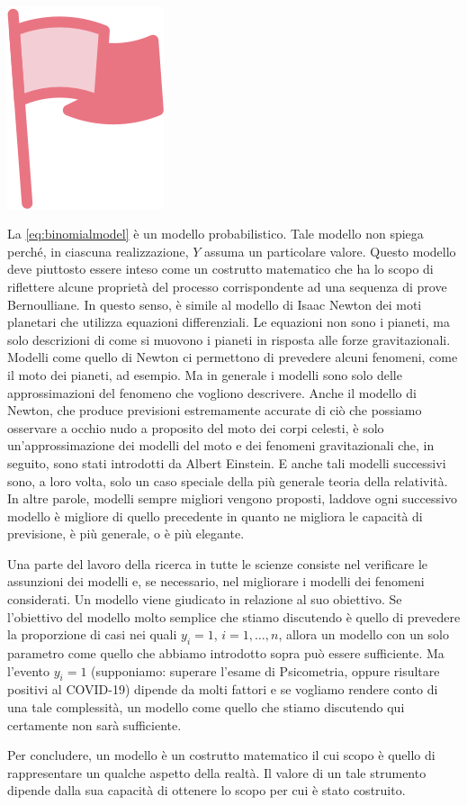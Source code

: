 \documentclass[
  10pt,
  italian,
  a4paper,
  extrafontsizes,onecolumn,openright
  ]{memoir}
\newenvironment{mdframedwithfootImportant}
{   
    \savenotes
    \begin{mdframed}[%
    topline=true, bottomline=true, linecolor=oiR, linewidth=0.5pt,
    rightline=false, leftline=false,
    backgroundcolor=oiLGray]
    \renewcommand{\thempfootnote}{\arabic{footnote}}
    }
{
    \end{mdframed}
    \spewnotes
}
\newenvironment{important}{
    \let\oldtextbf\textbf
    \renewcommand{\textbf}[1]{{\textcolor{oiR}{\oldtextbf{##1}}}}
\vspace{4mm}
\begin{mdframedwithfootImportant}
\begin{minipage}[t]{0.10\textwidth}
{$\:$ \\ \setkeys{Gin}{width=2.5em,keepaspectratio}\includegraphics{images/_icons/important.png}}
\end{minipage}
\hfill
\begin{minipage}[t]{0.90\textwidth}
\vspace{-2mm}
\setlength{\parskip}{1em}
}{\end{minipage}
\end{mdframedwithfootImportant}
\vspace{4mm}
}
\begin{document}
\begin{important}
La \eqref{eq:binomialmodel} è un modello probabilistico. Tale modello non spiega perché, in ciascuna realizzazione, \(Y\) assuma un particolare valore. Questo modello deve piuttosto essere inteso come un costrutto matematico che ha lo scopo di riflettere alcune proprietà del processo corrispondente ad una sequenza di prove Bernoulliane. In questo senso, è simile al modello di Isaac Newton dei moti planetari che utilizza equazioni differenziali. Le equazioni non sono i pianeti, ma solo descrizioni di come si muovono i pianeti in risposta alle forze gravitazionali. Modelli come quello di Newton ci permettono di prevedere alcuni fenomeni, come il moto dei pianeti, ad esempio. Ma in generale i modelli sono solo delle approssimazioni del fenomeno che vogliono descrivere. Anche il modello di Newton, che produce previsioni estremamente accurate di ciò che possiamo osservare a occhio nudo a proposito del moto dei corpi celesti, è solo un'approssimazione dei modelli del moto e dei fenomeni gravitazionali che, in seguito, sono stati introdotti da Albert Einstein. E anche tali modelli successivi sono, a loro volta, solo un caso speciale della più generale teoria della relatività. In altre parole, modelli sempre migliori vengono proposti, laddove ogni successivo modello è migliore di quello precedente in quanto ne migliora le capacità di previsione, è più generale, o è più elegante.

\end{important}

Una parte del lavoro della ricerca in tutte le scienze consiste nel verificare le assunzioni dei modelli e, se necessario, nel migliorare i modelli dei fenomeni considerati. Un modello viene giudicato in relazione al suo obiettivo. Se l'obiettivo del modello molto semplice che stiamo discutendo è quello di prevedere la proporzione di casi nei quali \(y_i = 1\), \(i = 1, \dots, n\), allora un modello con un solo parametro come quello che abbiamo introdotto sopra può essere sufficiente. Ma l'evento \(y_i=1\) (supponiamo: superare l'esame di Psicometria, oppure risultare positivi al COVID-19) dipende da molti fattori e se vogliamo rendere conto di una tale complessità, un modello come quello che stiamo discutendo qui certamente non sarà sufficiente.

Per concludere, un modello è un costrutto matematico il cui scopo è quello di rappresentare un qualche aspetto della realtà. Il valore di un tale strumento dipende dalla sua capacità di ottenere lo scopo per cui è stato costruito.
\end{document}
